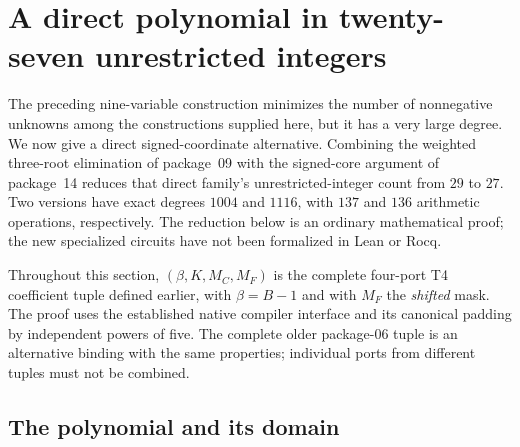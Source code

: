 \section{A direct polynomial in twenty-seven unrestricted integers}
\label{sec:integer27}

The preceding nine-variable construction minimizes the number of nonnegative
unknowns among the constructions supplied here, but it has a very large degree.
We now give a direct signed-coordinate alternative. Combining the weighted
three-root elimination of package~09 with the signed-core argument of
package~14 reduces that direct family's unrestricted-integer count from
$29$ to $27$. Two versions have exact degrees $1004$ and $1116$, with
$137$ and $136$ arithmetic operations, respectively. The reduction below is
an ordinary mathematical proof; the new specialized circuits have not been
formalized in Lean or Rocq.

Throughout this section, $(\beta,K,M_C,M_F)$ is the complete four-port T4
coefficient tuple defined earlier, with $\beta=B-1$ and with $M_F$ the
\emph{shifted} mask. The proof uses the established native compiler interface
and its canonical padding by independent powers of five. The complete older
package-06 tuple is an alternative binding with the same properties; individual
ports from different tuples must not be combined.

\subsection{The polynomial and its domain}

